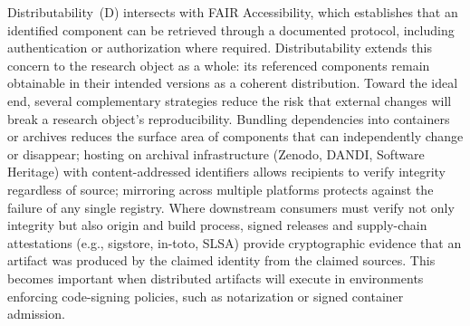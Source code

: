 \documentclass{article}
\begin{document}
Distributability~(D) intersects with FAIR Accessibility, which establishes that an identified component can be retrieved through a documented protocol, including authentication or authorization where required.
Distributability extends this concern to the research object as a whole: its referenced components remain obtainable in their intended versions as a coherent distribution.
Toward the ideal end, several complementary strategies reduce the risk that external changes will break a research object's reproducibility.
Bundling dependencies into containers or archives reduces the surface area of components that can independently change or disappear; hosting on archival infrastructure (Zenodo, DANDI, Software Heritage) with content-addressed identifiers allows recipients to verify integrity regardless of source; mirroring across multiple platforms protects against the failure of any single registry.
Where downstream consumers must verify not only integrity but also origin and build process, signed releases and supply-chain attestations (e.g., sigstore, in-toto, SLSA) provide cryptographic evidence that an artifact was produced by the claimed identity from the claimed sources.
This becomes important when distributed artifacts will execute in environments enforcing code-signing policies, such as notarization or signed container admission.
\end{document}
